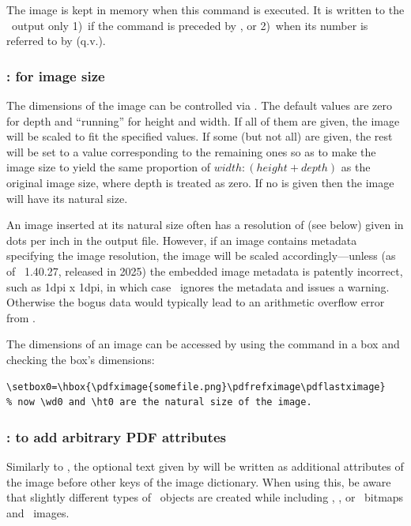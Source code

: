 \documentclass{pdftexmanual}
\begin{document}
The image is kept in memory when this command is executed. It is written
to the \PDF\ output only 1)~if the  command is
preceded by , or 2)~when its number is referred to by
 (q.v.).

\subsubsection{:  for image size}

The dimensions of the image can be controlled via .
The default values are zero for depth and ``running'' for height and
width. If all of them are given, the image will be scaled to fit the
specified values. If some (but not all) are given, the rest will be set
to a value corresponding to the remaining ones so as to make the image
size to yield the same proportion of $width : (height+depth)$ as the
original image size, where depth is treated as zero. If no
 is given then the image will have its natural
size.

An image inserted at its natural size often has a resolution of
\type{\pdfimageresolution} (see below) given in dots per inch in the
output file. However, if an image contains metadata specifying the image
resolution, the image will be scaled accordingly---unless (as of
\PDFTEX\ 1.40.27, released in 2025) the embedded image metadata is
patently incorrect, such as 1dpi x 1dpi, in which case \PDFTEX\ ignores
the metadata and issues a warning. Otherwise the bogus data would
typically lead to an arithmetic overflow error from \TEX.

The dimensions of an image can be accessed by using the
 command in a box and checking the box's dimensions:

\begin{verbatim}
\setbox0=\hbox{\pdfximage{somefile.png}\pdfrefximage\pdflastximage}
% now \wd0 and \ht0 are the natural size of the image.
\end{verbatim}

\subsubsection{: 
               to add arbitrary PDF attributes}

Similarly to , the optional text given by  will be written as additional attributes of the image before other
keys of the image dictionary. When using this, be aware that slightly
different types of \PDF\ objects are created while including \PNG,
\JPEG, or \ bitmaps and \PDF\ images.
\end{document}
